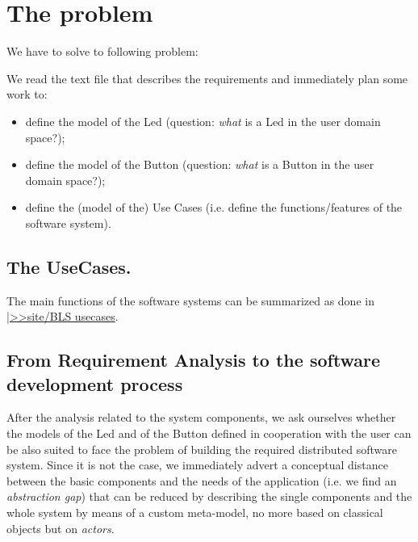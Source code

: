 \section{The problem}
We have to solve to following problem:
 
\medskip 
\scriptsize
{}
\normalsize
\medskip    

We read the text file that describes the requirements and immediately plan some work to:

\begin{itemize}
\item define the model of the Led (question: \textit{what} is a Led in the user domain space?);
\item define the model of the Button (question: \textit{what} is a Button in the user domain space?);
\item define the (model of the) Use Cases (i.e. define the functions/features of the software system).
\end{itemize}

\subsection{The UseCases.}
The main functions of the software systems can be summarized as done in
\href{https://137.204.107.21/syskb/it.unibo.iss2015intro/docs/Appls/ButtonLed/buttonLedHighLevelEntry.html}{|>>site/BLS usecases}.

\subsection{From Requirement Analysis to the software development process}

After the analysis related to the system components, we ask ourselves whether the models of the Led and of the Button defined in cooperation with the user can be also suited to face the problem of building the required distributed software system. Since it is not the case, we immediately advert a conceptual distance between the basic components and the needs of the application (i.e. we find an \textit{abstraction gap}) that can be reduced by describing the single components and the whole system by means of a custom meta-model, no more based on classical objects but on \textit{actors}.

